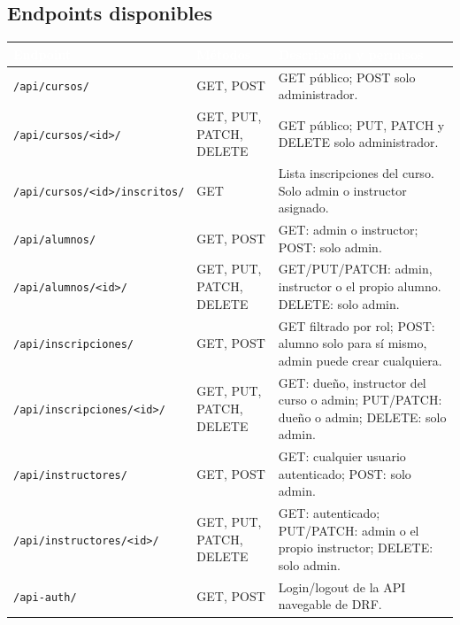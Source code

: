 \documentclass[11pt,letterpaper]{article}
\newcommand{\headrowcolor}{\rowcolor{azulUAZ}}
\newcommand{\headcell}[1]{\textcolor{white}{\textbf{#1}}}
\begin{document}
	\subsection{Endpoints disponibles}
	\begin{center}\small
		\begin{longtable}{|p{4.3cm}|p{3.3cm}|p{7.2cm}|}
			\hline
			\headrowcolor \headcell{Endpoint} & \headcell{M\'etodos} & \headcell{Descripci\'on y permisos} \\ \hline \endhead
			\texttt{/api/cursos/} & GET, POST & GET p\'ublico; POST solo administrador. \\ \hline
			\rowcolor{grisAlt}
			\texttt{/api/cursos/<id>/} & GET, PUT, PATCH, DELETE & GET p\'ublico; PUT, PATCH y DELETE solo administrador. \\ \hline
			\texttt{/api/cursos/<id>/inscritos/} & GET & Lista inscripciones del curso. Solo admin o instructor asignado. \\ \hline
			\rowcolor{grisAlt}
			\texttt{/api/alumnos/} & GET, POST & GET: admin o instructor; POST: solo admin. \\ \hline
			\texttt{/api/alumnos/<id>/} & GET, PUT, PATCH, DELETE & GET/PUT/PATCH: admin, instructor o el propio alumno. DELETE: solo admin. \\ \hline
			\rowcolor{grisAlt}
			\texttt{/api/inscripciones/} & GET, POST & GET filtrado por rol; POST: alumno solo para s\'i mismo, admin puede crear cualquiera. \\ \hline
			\texttt{/api/inscripciones/<id>/} & GET, PUT, PATCH, DELETE & GET: due\~no, instructor del curso o admin; PUT/PATCH: due\~no o admin; DELETE: solo admin. \\ \hline
			\rowcolor{grisAlt}
			\texttt{/api/instructores/} & GET, POST & GET: cualquier usuario autenticado; POST: solo admin. \\ \hline
			\texttt{/api/instructores/<id>/} & GET, PUT, PATCH, DELETE & GET: autenticado; PUT/PATCH: admin o el propio instructor; DELETE: solo admin. \\ \hline
			\rowcolor{grisAlt}
			\texttt{/api-auth/} & GET, POST & Login/logout de la API navegable de DRF. \\ \hline
		\end{longtable}
	\end{center}
	
\end{document}
